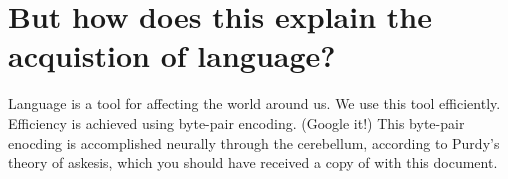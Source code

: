 \documentclass{article}
\begin{document}
\section{But how does this explain the acquistion of language?}

Language is a tool for affecting the world around us. We use this tool
efficiently. Efficiency is achieved using byte-pair encoding. (Google
it!) This byte-pair enocding is accomplished neurally through the
cerebellum, according to Purdy's theory of askesis, which you should
have received a copy of with this document.
\end{document}

